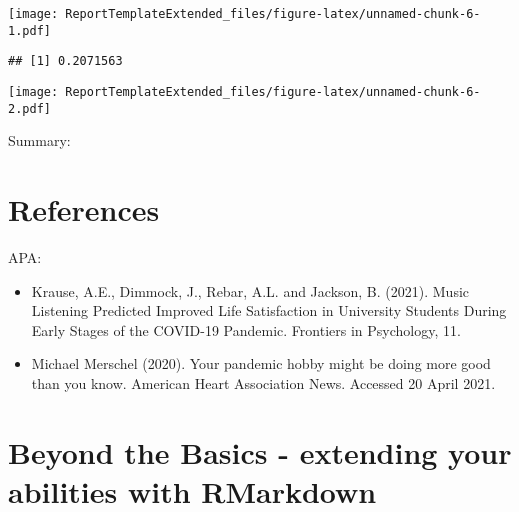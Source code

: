\documentclass[
]{article}
\newenvironment{Shaded}{\begin{snugshade}}{\end{snugshade}}
\newcommand{\AttributeTok}[1]{\textcolor[rgb]{0.77,0.63,0.00}{#1}}
\newcommand{\CommentTok}[1]{\textcolor[rgb]{0.56,0.35,0.01}{\textit{#1}}}
\newcommand{\DecValTok}[1]{\textcolor[rgb]{0.00,0.00,0.81}{#1}}
\newcommand{\FunctionTok}[1]{\textcolor[rgb]{0.00,0.00,0.00}{#1}}
\newcommand{\NormalTok}[1]{#1}
\newcommand{\SpecialCharTok}[1]{\textcolor[rgb]{0.00,0.00,0.00}{#1}}
\newcommand{\StringTok}[1]{\textcolor[rgb]{0.31,0.60,0.02}{#1}}
\providecommand{\tightlist}{%
  \setlength{\itemsep}{0pt}\setlength{\parskip}{0pt}}
\begin{document}
\texttt{[image: ReportTemplateExtended\_files/figure-latex/unnamed-chunk-6-1.pdf]}

\begin{Shaded}
\end{Shaded}

\begin{verbatim}
## [1] 0.2071563
\end{verbatim}

\begin{Shaded}
\end{Shaded}

\texttt{[image: ReportTemplateExtended\_files/figure-latex/unnamed-chunk-6-2.pdf]}

Summary:

\hypertarget{references}{%
\section{References}\label{references}}

APA:

\begin{itemize}
\tightlist
\item
  Krause, A.E., Dimmock, J., Rebar, A.L. and Jackson, B. (2021). Music
  Listening Predicted Improved Life Satisfaction in University Students
  During Early Stages of the COVID-19 Pandemic. Frontiers in Psychology,
  11.
\item
  Michael Merschel (2020). Your pandemic hobby might be doing more good
  than you know. American Heart Association News. Accessed 20 April
  2021.
\end{itemize}

\hypertarget{beyond-the-basics---extending-your-abilities-with-rmarkdown}{%
\section{Beyond the Basics - extending your abilities with
RMarkdown}\label{beyond-the-basics---extending-your-abilities-with-rmarkdown}}
\end{document}
